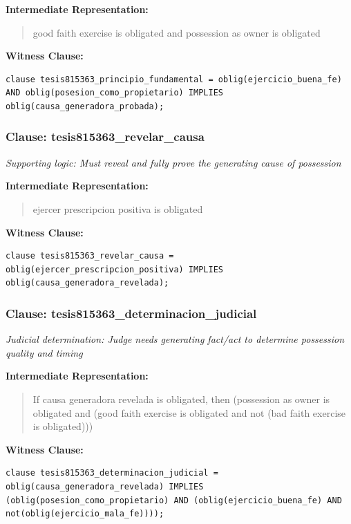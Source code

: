 \documentclass[11pt,a4paper]{article}
\begin{document}
\textbf{Intermediate Representation:}

\begin{quote}
good faith exercise is obligated and possession as owner is obligated
\end{quote}

\textbf{Witness Clause:}

\begin{lstlisting}[style=witnessstyle, language=Witness]
clause tesis815363_principio_fundamental = oblig(ejercicio_buena_fe) AND oblig(posesion_como_propietario) IMPLIES oblig(causa_generadora_probada);
\end{lstlisting}

\subsubsection{Clause: tesis815363\_revelar\_causa}

\textit{Supporting logic: Must reveal and fully prove the generating cause of possession}

\textbf{Intermediate Representation:}

\begin{quote}
ejercer prescripcion positiva is obligated
\end{quote}

\textbf{Witness Clause:}

\begin{lstlisting}[style=witnessstyle, language=Witness]
clause tesis815363_revelar_causa = oblig(ejercer_prescripcion_positiva) IMPLIES oblig(causa_generadora_revelada);
\end{lstlisting}

\subsubsection{Clause: tesis815363\_determinacion\_judicial}

\textit{Judicial determination: Judge needs generating fact/act to determine possession quality and timing}

\textbf{Intermediate Representation:}

\begin{quote}
If causa generadora revelada is obligated, then (possession as owner is obligated and (good faith exercise is obligated and not (bad faith exercise is obligated)))
\end{quote}

\textbf{Witness Clause:}

\begin{lstlisting}[style=witnessstyle, language=Witness]
clause tesis815363_determinacion_judicial = oblig(causa_generadora_revelada) IMPLIES (oblig(posesion_como_propietario) AND (oblig(ejercicio_buena_fe) AND not(oblig(ejercicio_mala_fe))));
\end{lstlisting}
\end{document}
